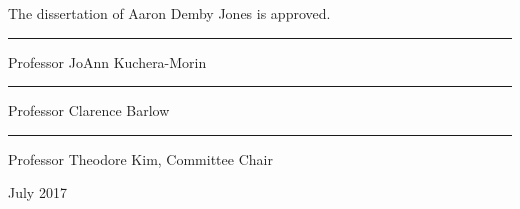 {\centering
\thispagestyle{empty}
The dissertation of Aaron Demby Jones is approved.
\vfil
\begin{minipage}{0.65\textwidth}
\centering
  \rule{\textwidth}{0.7pt}
  {\sc Professor JoAnn Kuchera-Morin}
\end{minipage}
\hfill

\vfil
\begin{minipage}{0.65\textwidth}
\centering
  \rule{\textwidth}{0.7pt}
  {\sc Professor Clarence Barlow}
\end{minipage}
\hfill

\vfil
\begin{minipage}{0.65\textwidth}
\centering
  \rule{\textwidth}{0.7pt}
  {\sc Professor Theodore Kim, Committee Chair}
\end{minipage}
\hfill

\vfil
\begin{minipage}{0.65\textwidth}
\centering
  {July 2017}
  \end{minipage}
  \hfill
  
  }


